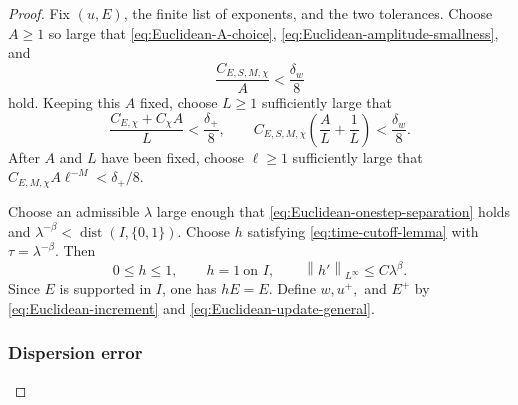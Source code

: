 \documentclass[12pt,reqno,letterpaper]{amsart}
\numberwithin{equation}{section}
\theoremstyle{definition}
\newcommand{\la}{\lambda}
\newcommand{\norm}[1]{\left\lVert #1\right\rVert}
\begin{document}
\begin{proof}
Fix $(u,E)$, the finite list of exponents, and the two tolerances.
Choose $A\geq1$ so large that \eqref{eq:Euclidean-A-choice},
\eqref{eq:Euclidean-amplitude-smallness}, and
\begin{equation*}
 \frac{C_{E,S,M,\chi}}{A}<\frac{\delta_w}8
\end{equation*}
  hold.  Keeping this $A$ fixed, choose $L\geq1$ sufficiently large that
\begin{equation*}
 \frac{C_{E,\chi}+C_\chi A}{L}<\frac{\delta_+}{8},
 \qquad
 C_{E,S,M,\chi}\left(\frac{A}{L}+\frac1L\right)<\frac{\delta_w}8.
\end{equation*}
After $A$ and $L$ have been fixed, choose $\ell\geq1$ sufficiently large
that $C_{E,M,\chi}A\ell^{-M}<\delta_+/8$.

Choose an admissible $\la$ large enough that
\eqref{eq:Euclidean-onestep-separation} holds and
$\la^{-\beta}<\operatorname{dist}(I,\{0,1\})$.  Choose $h$ satisfying
\eqref{eq:time-cutoff-lemma} with $\tau=\la^{-\beta}$.  Then
\begin{equation*}
 0\leq h\leq1,\qquad h=1\ \text{on }I,\qquad
 \norm{h'}_{L^\infty}\leq C\la^\beta.
\end{equation*}
Since $E$ is supported in $I$, one has $hE=E$.  Define $w,u^+,$ and $E^+$
by \eqref{eq:Euclidean-increment} and
\eqref{eq:Euclidean-update-general}.

\subsubsection*{Dispersion error}


\end{proof}
\end{document}
